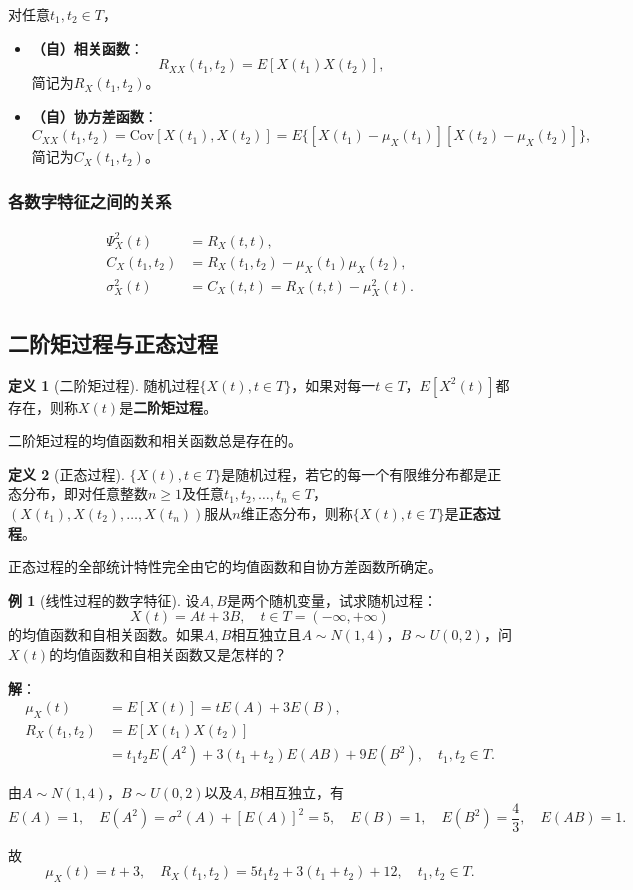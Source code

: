 \documentclass[11pt,a4paper]{report}
\theoremstyle{definition}
\newtheorem{definition}{定义}[chapter]
\newtheorem{example}{例}[chapter]
\begin{document}
对任意$t_1,t_2\in T$，
\begin{itemize}[leftmargin=2em]
    \item \textbf{（自）相关函数}：
    \[
    R_{XX}(t_1,t_2)=E[X(t_1)X(t_2)],
    \]
    简记为$R_X(t_1,t_2)$。
    \item \textbf{（自）协方差函数}：
    \[
    C_{XX}(t_1,t_2)=\mathrm{Cov}[X(t_1),X(t_2)]=E\{[X(t_1)-\mu_X(t_1)][X(t_2)-\mu_X(t_2)]\},
    \]
    简记为$C_X(t_1,t_2)$。
\end{itemize}

\subsubsection{各数字特征之间的关系}

\begin{align*}
\Psi_X^2(t)&=R_X(t,t),\\
C_X(t_1,t_2)&=R_X(t_1,t_2)-\mu_X(t_1)\mu_X(t_2),\\
\sigma_X^2(t)&=C_X(t,t)=R_X(t,t)-\mu_X^2(t).
\end{align*}

\subsection{二阶矩过程与正态过程}

\begin{definition}[二阶矩过程]
随机过程$\{X(t),t\in T\}$，如果对每一$t\in T$，$E[X^2(t)]$都存在，则称$X(t)$是\textbf{二阶矩过程}。
\end{definition}

二阶矩过程的均值函数和相关函数总是存在的。

\begin{definition}[正态过程]
$\{X(t),t\in T\}$是随机过程，若它的每一个有限维分布都是正态分布，即对任意整数$n\geq1$及任意$t_1,t_2,\ldots,t_n\in T$，$(X(t_1),X(t_2),\ldots,X(t_n))$服从$n$维正态分布，则称$\{X(t),t\in T\}$是\textbf{正态过程}。
\end{definition}

正态过程的全部统计特性完全由它的均值函数和自协方差函数所确定。

\begin{example}[线性过程的数字特征]
设$A,B$是两个随机变量，试求随机过程：
\[
X(t)=At+3B,\quad t\in T=(-\infty,+\infty)
\]
的均值函数和自相关函数。如果$A,B$相互独立且$A\sim N(1,4)$，$B\sim U(0,2)$，问$X(t)$的均值函数和自相关函数又是怎样的？

\textbf{解}：
\begin{align*}
\mu_X(t)&=E[X(t)]=tE(A)+3E(B),\\
R_X(t_1,t_2)&=E[X(t_1)X(t_2)]\\
&=t_1t_2E(A^2)+3(t_1+t_2)E(AB)+9E(B^2),\quad t_1,t_2\in T.
\end{align*}

由$A\sim N(1,4)$，$B\sim U(0,2)$以及$A,B$相互独立，有
\[
E(A)=1,\quad E(A^2)=\sigma^2(A)+[E(A)]^2=5,\quad E(B)=1,\quad E(B^2)=\frac{4}{3},\quad E(AB)=1.
\]

故
\[
\mu_X(t)=t+3,\quad R_X(t_1,t_2)=5t_1t_2+3(t_1+t_2)+12,\quad t_1,t_2\in T.
\]
\end{example}
\end{document}

